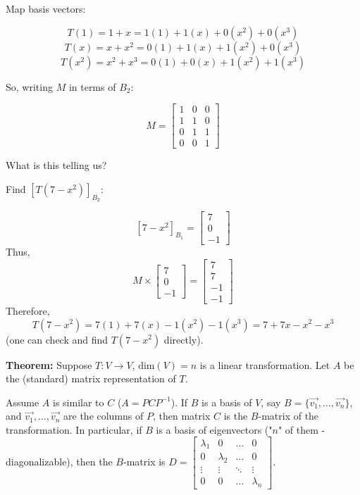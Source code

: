 \documentclass{article}
\begin{document}
Map basis vectors:

\[ T(1) = 1 + x = 1(1) + 1(x) + 0(x^2) + 0(x^3) \]
\[ T(x) = x + x^2 = 0(1) + 1(x) + 1(x^2) + 0(x^3) \]
\[ T(x^2) = x^2 + x^3 = 0(1) + 0(x) + 1(x^2) + 1(x^3) \]

So, writing $M$ in terms of $B_2$:

\[ M = \begin{bmatrix} 1 & 0 & 0 \\ 1 & 1 & 0 \\ 0 & 1 & 1 \\ 0 & 0 & 1 \end{bmatrix} \]

What is this telling us?

Find $[T(7 - x^2)]_{B_2}$:

\[
[7 - x^2]_{B_1} = \begin{bmatrix} 7 \\ 0 \\ -1 \end{bmatrix}
\]
Thus,
\[
M \times \begin{bmatrix} 7 \\ 0 \\ -1 \end{bmatrix} = \begin{bmatrix} 7 \\ 7 \\ -1 \\ -1 \end{bmatrix}
\]
Therefore, 
\[
T(7 - x^2) = 7(1) + 7(x) - 1(x^2) - 1(x^3) = 7 + 7x - x^2 - x^3
\]
(one can check and find \( T(7 - x^2) \) directly).

\textbf{Theorem:} Suppose $T : V \rightarrow V$, $\text{dim}(V) = n$ is a linear transformation. Let $A$ be the (standard) matrix representation of $T$.

Assume $A$ is similar to $C$ ($A = PCP^{-1}$). If $B$ is a basis of $V$, say $B = \{\vec{v_1}, \ldots, \vec{v_n}\}$, and $\vec{v_1}, \ldots, \vec{v_n}$ are the columns of $P$, then matrix $C$ is the $B$-matrix of the transformation. In particular, if $B$ is a basis of eigenvectors ("$n$" of them - diagonalizable), then the $B$-matrix is $D = \left[ \begin{array}{cccc} \lambda_1 & 0 & \ldots & 0 \\ 0 & \lambda_2 & \ldots & 0 \\ \vdots & \vdots & \ddots & \vdots \\ 0 & 0 & \ldots & \lambda_n \end{array} \right]$.
\end{document}
